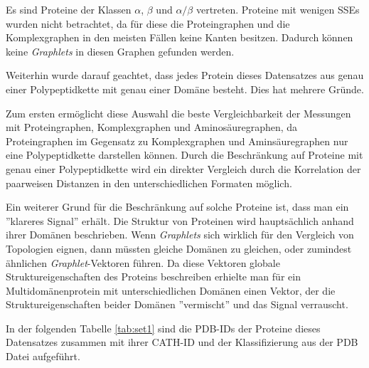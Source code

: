 \documentclass{report}
\begin{document}
Es sind Proteine der Klassen $\alpha$, $\beta$ und $\alpha/\beta$ vertreten. Proteine mit wenigen SSEs wurden nicht betrachtet, da f\"ur diese die Proteingraphen und die Komplexgraphen in den meisten F\"allen keine Kanten besitzen. Dadurch k\"onnen keine \textit{Graphlets} in diesen Graphen gefunden werden.

Weiterhin wurde darauf geachtet, dass jedes Protein dieses Datensatzes aus genau einer Polypeptidkette mit genau einer Dom\"ane besteht. Dies hat mehrere Gr\"unde.

Zum ersten erm\"oglicht diese Auswahl die beste Vergleichbarkeit der Messungen mit Proteingraphen, Komplexgraphen und Aminos\"auregraphen, da Proteingraphen im Gegensatz zu Komplexgraphen und Amins\"auregraphen nur eine Polypeptidkette darstellen k\"onnen. Durch die Beschr\"ankung auf Proteine mit genau einer Polypeptidkette wird ein direkter Vergleich durch die Korrelation der paarweisen Distanzen in den unterschiedlichen Formaten m\"oglich.

Ein weiterer Grund f\"ur die Beschr\"ankung auf solche Proteine ist, dass man ein ''klareres Signal'' erh\"alt. Die Struktur von Proteinen wird haupts\"achlich anhand ihrer Dom\"anen beschrieben. Wenn \textit{Graphlets} sich wirklich f\"ur den Vergleich von Topologien eignen, dann m\"ussten gleiche Dom\"anen zu gleichen, oder zumindest \"ahnlichen \textit{Graphlet}-Vektoren f\"uhren.
Da diese Vektoren globale Struktureigenschaften des Proteins beschreiben erhielte man f\"ur ein Multidom\"anenprotein mit unterschiedlichen Dom\"anen einen Vektor, der die Struktureigenschaften beider Dom\"anen ''vermischt'' und das Signal verrauscht.


In der folgenden Tabelle \ref{tab:set1} sind die PDB-IDs der Proteine dieses Datensatzes zusammen mit ihrer CATH-ID und der Klassifizierung aus der PDB Datei aufgef\"uhrt.
\end{document}
